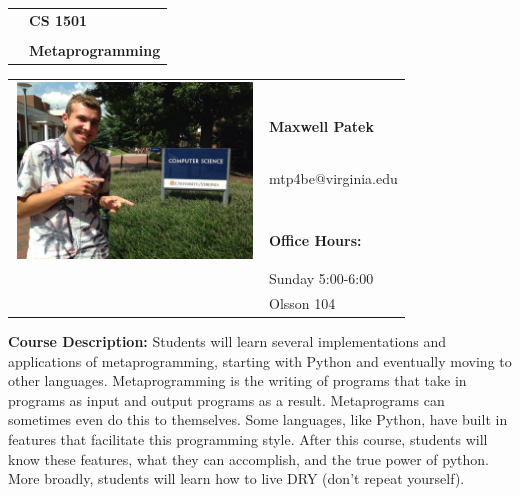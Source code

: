 \documentclass[11pt]{article}
\begin{document}
\begin{tabular}{ l l }
  & \LARGE \textbf{CS 1501} \\\\
  & \LARGE \textbf{Metaprogramming} \\
\end{tabular}
\vspace{10mm}

\begin{center}
\begin{tabular}{ l l }
  \multirow{6}{*}{\includegraphics[height=1.85in,width=2.5in]{14040198_10154458676878599_2951113492452685662_n.jpg}} & \\ \\
  & \textbf{\large Maxwell Patek} \\
  & \hspace{2mm} \large mtp4be@virginia.edu \\\\
  & \large \textbf{Office Hours:} \\
  & \hspace{2mm} \large Sunday 5:00-6:00\\
  & \hspace{2mm} \large Olsson 104\\
\end{tabular}
\end{center}

\vspace{10mm}


\textbf {\large  Course Description:} Students will learn several implementations and applications of metaprogramming, starting with Python and eventually moving to other languages. Metaprogramming is the writing of programs that take in programs as input and output programs as a result. Metaprograms can sometimes even do this to themselves. Some languages, like Python, have built in features that facilitate this programming style. After this course, students will know these features, what they can accomplish, and the true power of python. More broadly, students will learn how to live DRY (don't repeat yourself). \\
\end{document}
